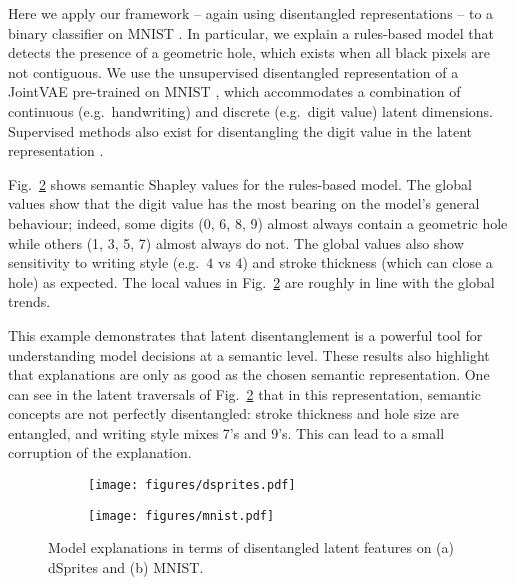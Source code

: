 \documentclass{article}
\DeclareRobustCommand{\Fig}[1]{Fig.~\ref{fig:#1}}
\begin{document}
Here we apply our framework -- again using disentangled representations -- to a binary classifier on MNIST \citep{mnist2010}. In particular, we explain a rules-based model that detects the presence of a geometric hole, which exists when all black pixels are not contiguous. We use the unsupervised disentangled representation of a JointVAE pre-trained on MNIST \citep{JointVAE}, which accommodates a combination of continuous (e.g.~handwriting) and discrete (e.g.~digit value) latent dimensions. Supervised methods also exist for disentangling the digit value in the latent representation \citep{Adversarialautoencoder}.

\Fig{mnist} shows semantic Shapley values for the rules-based model. The global values show that the digit value has the most bearing on the model's general behaviour; indeed, some digits (0, 6, 8, 9) almost always contain a geometric hole while others (1, 3, 5, 7) almost always do not. The global values also show sensitivity to writing style (e.g.~$4$ vs $\mathit{4}$) and stroke thickness (which can close a hole) as expected. The local values in \Fig{mnist} are roughly in line with the global trends.

This example demonstrates that latent disentanglement is a powerful tool for understanding model decisions at a semantic level. These results also highlight that explanations are only as good as the chosen semantic representation. One can see in the latent traversals of \Fig{mnist} that in this representation, semantic concepts are not perfectly disentangled: stroke thickness and hole size are entangled, and writing style mixes 7's and 9's. This can lead to a small corruption of the explanation.


\begin{figure}[!t]
    \centering
    \begin{subfigure}[b]{0.45\textwidth}
        \centering
        \texttt{[image: figures/dsprites.pdf]}
        \caption{}
        \label{fig:dsprites}
    \end{subfigure}
    \hskip 5mm
    \begin{subfigure}[b]{0.45\textwidth}
        \centering
        \texttt{[image: figures/mnist.pdf]}
        \caption{}
        \label{fig:mnist}
    \end{subfigure}
    \caption{Model explanations in terms of disentangled latent features on (a) dSprites and (b) MNIST.}
    \label{fig:dsprites_mnist}
\end{figure}
\end{document}
